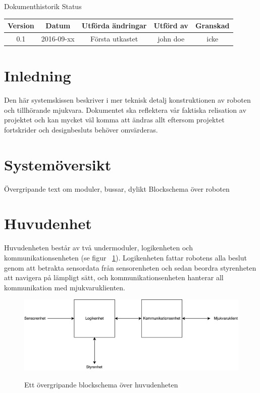 \documentclass{article}
\begin{document}
\renewcommand*\contentsname{Innehållsförteckning}
\tableofcontents
\clearpage


{
\sffamily
\centering
\large


{\huge 
Dokumenthistorik
}
Status
\begin{center}
\begin{tabular}{ | c | c | c | c | c |} 
\hline
\textbf{Version} & \textbf{Datum} & \textbf{Utförda ändringar} & \textbf{Utförd av } & \textbf{Granskad} \\  
\hline
0.1 & 2016-09-xx & Första utkastet &  john doe & icke \\
\hline
\end{tabular}
\end{center}
}

\clearpage


\section{Inledning}
Den här systemskissen beskriver i mer teknisk detalj konstruktionen av roboten och tillhörande mjukvara. Dokumentet ska reflektera vår faktiska relisation av projektet och kan mycket väl komma att ändras allt eftersom projektet fortskrider och designbesluts behöver omvärderas.

\section{Systemöversikt}
Övergripande text om moduler, bussar, dylikt
Blockschema över roboten

\section{Huvudenhet}

Huvudenheten består av två undermoduler, logikenheten och kommunikationsenheten (se figur ~\ref{fig:huvudenhet}). Logikenheten fattar robotens alla beslut genom att betrakta sensordata från sensorenheten och sedan beordra styrenheten att navigera på lämpligt sätt, och kommunikationsenheten hanterar all kommunikation med mjukvaruklienten. 

\begin{figure}[H]
  \centering
  \includegraphics[scale=0.5]{Huvudenhet} \\
  \caption{Ett övergripande blockschema över huvudenheten}
  \label{fig:huvudenhet}
\end{figure}
\end{document}
